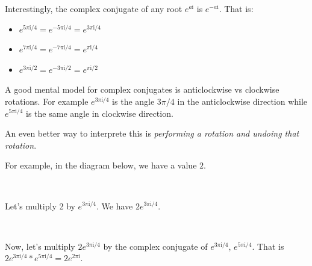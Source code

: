 \documentclass[11pt]{article}
\providecommand{\tightlist}{%
      \setlength{\itemsep}{0pt}\setlength{\parskip}{0pt}}
\begin{document}
Interestingly, the complex conjugate of any root \(e^{a\mathrm{i}}\) is
\(e^{-a\mathrm{i}}\). That is:

\begin{itemize}
\tightlist
\item
  \(e^{5\pi\mathrm{i}/4} = e^{-5\pi\mathrm{i}/4} = e^{3\pi\mathrm{i}/4}\)
\item
  \(e^{7\pi\mathrm{i}/4} = e^{-7\pi\mathrm{i}/4} = e^{\pi\mathrm{i}/4}\)
\item
  \(e^{3\pi\mathrm{i}/2} = e^{-3\pi\mathrm{i}/2} = e^{\pi\mathrm{i}/2}\)
\end{itemize}

A good mental model for complex conjugates is anticlockwise vs clockwise
rotations. For example \(e^{3\pi\mathrm{i}/4}\) is the angle \(3\pi/4\)
in the anticlockwise direction while \(e^{5\pi\mathrm{i}/4}\) is the
same angle in clockwise direction.

An even better way to interprete this is \emph{performing a rotation and
undoing that rotation}.

For example, in the diagram below, we have a value \(2\).

    \begin{center}
    \end{center}
    { \hspace*{\fill} \\}
    
    Let's multiply 2 by \(e^{{3\pi\mathrm{i}}/4}\). We have
\(2e^{{3\pi\mathrm{i}}/4}\).

    \begin{center}
    \end{center}
    { \hspace*{\fill} \\}
    
    Now, let's multiply \(2e^{{3\pi\mathrm{i}}/4}\) by the complex conjugate
of \(e^{{3\pi\mathrm{i}}/4}\), \(e^{5\pi\mathrm{i}/4}\). That is
\(2e^{{3\pi\mathrm{i}}/4} * e^{5\pi\mathrm{i}/4} = 2e^{{2\pi\mathrm{i}}}\).

    \begin{center}
    \end{center}
    { \hspace*{\fill} \\}
    
\end{document}
